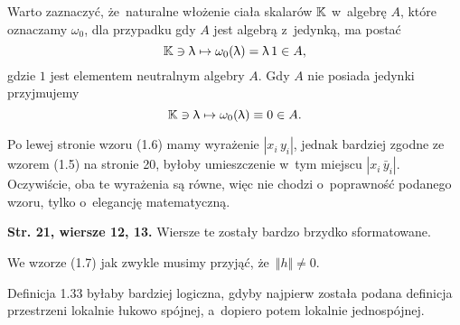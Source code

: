 \documentclass[a4paper,11pt]{article}
\begin{document}
\vspace{\spaceFour}





\start {} Warto zaznaczyć, że~naturalne włożenie ciała skalarów
$\mathbb{K}$ w~algebrę $A$, które oznaczamy $\omega_{ 0 }$, dla przypadku gdy $A$ jest
algebrą z~jedynką, ma postać
\begin{equation}
  \label{eq:Wojtynski-02}
  \mathbb{K} \ni \uplambda \mapsto \omega_{ 0 }( \uplambda ) = \uplambda \, 1 \in A,
\end{equation}
gdzie $1$ jest elementem neutralnym algebry $A$. Gdy $A$ nie posiada jedynki
przyjmujemy
\begin{equation}
  \label{eq:Wojtynski-03}
  \mathbb{K} \ni \uplambda \mapsto \omega_{ 0 }( \uplambda ) \equiv 0 \in A.
\end{equation}

\vspace{\spaceFour}





\start {} Po lewej stronie wzoru (1.6) mamy wyrażenie
$| x_{ i } \, y_{ i } |$, jednak bardziej zgodne ze wzorem (1.5) na stronie 20,
byłoby umieszczenie w~tym miejscu $| x_{ i } \, \bar{y}_{ i } |$. Oczywiście,
oba te wyrażenia są równe, więc nie chodzi o~poprawność podanego wzoru,
tylko o~elegancję matematyczną.

\vspace{\spaceFour}





\start \textbf{Str. 21, wiersze 12, 13.} Wiersze te zostały bardzo brzydko
sformatowane.

\vspace{\spaceFour}





\start {} We wzorze (1.7) jak zwykle musimy przyjąć, że~$\Vert h \Vert \neq 0$.

\vspace{\spaceFour}





\start {} Definicja 1.33 byłaby bardziej logiczna, gdyby najpierw
została podana definicja przestrzeni lokalnie łukowo spójnej, a~dopiero
potem lokalnie jednospójnej.

\vspace{\spaceFour}
\end{document}
